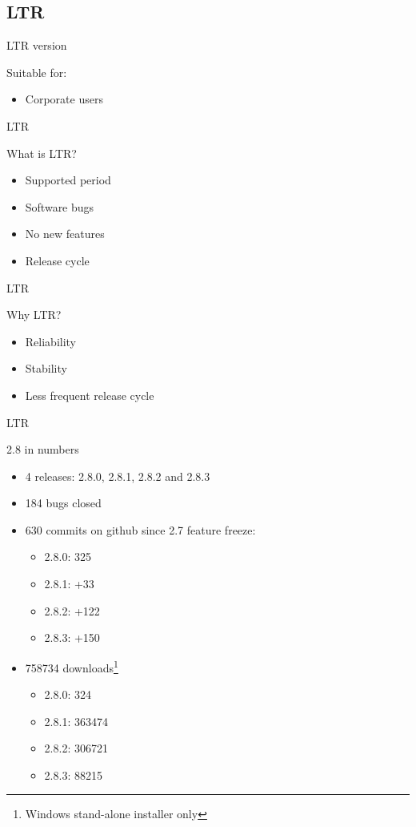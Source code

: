 \subsection{LTR}
\begin{frame}{LTR version}
	\begin{block}{Suitable for:}
		\begin{itemize}
			\item Corporate users
		\end{itemize}
	\end{block}
\end{frame}

\begin{frame}{LTR}
	\begin{block}{What is LTR?}
		\begin{itemize}
			\item Supported period
			\item Software bugs 
			\item No new features
			\item Release cycle
		\end{itemize}
	\end{block}
\end{frame}

\begin{frame}{LTR}
	\begin{block}{Why LTR?}
		\begin{itemize}
			\item Reliability
			\item Stability
			\item Less frequent release cycle 
		\end{itemize}
	\end{block}
\end{frame}

\begin{frame}{LTR}
	\begin{block}{2.8 in numbers}
		\begin{itemize}
			\item 4 releases: 2.8.0, 2.8.1, 2.8.2 and 2.8.3
			\item 184 bugs closed
			\item 630 commits on github since 2.7 feature freeze:
			\begin{itemize}
				\item 2.8.0: 325
				\item 2.8.1: +33
				\item 2.8.2: +122
				\item 2.8.3: +150
			\end{itemize}
			\item 758734 downloads\footnote{Windows stand-alone installer only}
			\begin{itemize}
				\item 2.8.0: 324
				\item 2.8.1: 363474
				\item 2.8.2: 306721
				\item 2.8.3: 88215
			\end{itemize}			
		\end{itemize}
	\end{block}
\end{frame}

